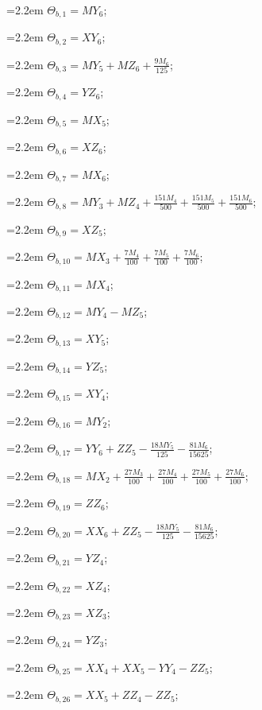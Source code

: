 {\small\setlength{\parindent}{0pt}\raggedright
\hangindent=2.2em $\Theta_{b,1}=MY_{6}$;\par
\hangindent=2.2em $\Theta_{b,2}=XY_{6}$;\par
\hangindent=2.2em $\Theta_{b,3}=MY_{5}+MZ_{6}+\tfrac{9M_{6}}{125}$;\par
\hangindent=2.2em $\Theta_{b,4}=YZ_{6}$;\par
\hangindent=2.2em $\Theta_{b,5}=MX_{5}$;\par
\hangindent=2.2em $\Theta_{b,6}=XZ_{6}$;\par
\hangindent=2.2em $\Theta_{b,7}=MX_{6}$;\par
\hangindent=2.2em $\Theta_{b,8}=MY_{3}+MZ_{4}+\tfrac{151M_{4}}{500}+\tfrac{151M_{5}}{500}+\tfrac{151M_{6}}{500}$;\par
\hangindent=2.2em $\Theta_{b,9}=XZ_{5}$;\par
\hangindent=2.2em $\Theta_{b,10}=MX_{3}+\tfrac{7M_{4}}{100}+\tfrac{7M_{5}}{100}+\tfrac{7M_{6}}{100}$;\par
\hangindent=2.2em $\Theta_{b,11}=MX_{4}$;\par
\hangindent=2.2em $\Theta_{b,12}=MY_{4}-MZ_{5}$;\par
\hangindent=2.2em $\Theta_{b,13}=XY_{5}$;\par
\hangindent=2.2em $\Theta_{b,14}=YZ_{5}$;\par
\hangindent=2.2em $\Theta_{b,15}=XY_{4}$;\par
\hangindent=2.2em $\Theta_{b,16}=MY_{2}$;\par
\hangindent=2.2em $\Theta_{b,17}=YY_{6}+ZZ_{5}-\tfrac{18MY_{5}}{125}-\tfrac{81M_{6}}{15625}$;\par
\hangindent=2.2em $\Theta_{b,18}=MX_{2}+\tfrac{27M_{3}}{100}+\tfrac{27M_{4}}{100}+\tfrac{27M_{5}}{100}+\tfrac{27M_{6}}{100}$;\par
\hangindent=2.2em $\Theta_{b,19}=ZZ_{6}$;\par
\hangindent=2.2em $\Theta_{b,20}=XX_{6}+ZZ_{5}-\tfrac{18MY_{5}}{125}-\tfrac{81M_{6}}{15625}$;\par
\hangindent=2.2em $\Theta_{b,21}=YZ_{4}$;\par
\hangindent=2.2em $\Theta_{b,22}=XZ_{4}$;\par
\hangindent=2.2em $\Theta_{b,23}=XZ_{3}$;\par
\hangindent=2.2em $\Theta_{b,24}=YZ_{3}$;\par
\hangindent=2.2em $\Theta_{b,25}=XX_{4}+XX_{5}-YY_{4}-ZZ_{5}$;\par
\hangindent=2.2em $\Theta_{b,26}=XX_{5}+ZZ_{4}-ZZ_{5}$;\par
}
